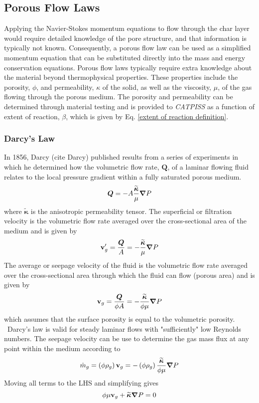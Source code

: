 \subsection{Porous Flow Laws}
Applying the Navier-Stokes momentum equations to flow through the char layer
would require detailed knowledge of the pore structure, and that information
is typically not known.  Consequently, a porous flow law can be used as a simplified momentum equation that can be substituted
directly into the mass and energy conservation equations.  Porous flow laws typically require extra knowledge about
the material beyond thermophysical properties.  These properties include the porosity, $\phi$, and permeability, $\kappa$
of the solid, as well as the viscosity, $\mu$, of the gas flowing through the porous medium.  The porosity and permeability can be determined through
material testing and is provided to \textit{CATPISS} as a function of extent of reaction, $\beta$, which is given by Eq. \ref{extent of reaction definition}.
\subsubsection{Darcy's Law}
In 1856, Darcy (cite Darcy) published results from a series
of experiments in which he determined how the volumetric flow rate, $\boldsymbol{Q}$, of a
laminar flowing fluid relates to the local pressure gradient within a fully
saturated porous medium.
\begin{equation}
\boldsymbol{Q}=-A\dfrac{\widetilde{\boldsymbol{\kappa}} }{\mu }{\boldsymbol{\nabla}} {P}
\end{equation}%
where $\widetilde{\boldsymbol{\kappa}}$ is the anisotropic permeability tensor. The superficial or filtration velocity is the volumetric flow rate averaged
over the cross-sectional area of the medium and is given by%
\begin{equation}
\mathbf{v}^{\prime }_{g} =\frac{\boldsymbol{Q}}{A}=-\frac{\widetilde{\boldsymbol{\kappa}} }{\mu }{\boldsymbol{\nabla}} {P}
\end{equation}%
The average or seepage velocity of the fluid is the volumetric flow rate
averaged over the cross-sectional area through which the fluid can flow
(porous area) and is given by%
\begin{equation}
\mathbf{v}_{g} =\frac{\boldsymbol{Q}}{\phi A}=-\frac{\widetilde{\boldsymbol{\kappa}} }{\phi \mu }{\boldsymbol{\nabla}} {P}
\end{equation}%
which assumes that the surface porosity is equal to the volumetric porosity.
\ Darcy's law is valid for steady laminar flows with "sufficiently" low Reynolds
numbers.  The seepage velocity can be use to determine the gas mass flux at any point within the medium according to
\begin{equation}
  \dot{m}_{g} = \left( \phi \rho_{g} \right) \mathbf{v}_g = -\left( \phi \rho_{g} \right)\frac{ \widetilde{\boldsymbol{\kappa}}}{\phi \mu }{\boldsymbol{\nabla}} {P}
\end{equation}%
Moving all terms to the LHS and simplifying gives
\begin{equation}
  \phi\mu \mathbf{v}_g + \widetilde{\boldsymbol{\kappa}}{\boldsymbol{\nabla}} {P} = 0
\end{equation}%

